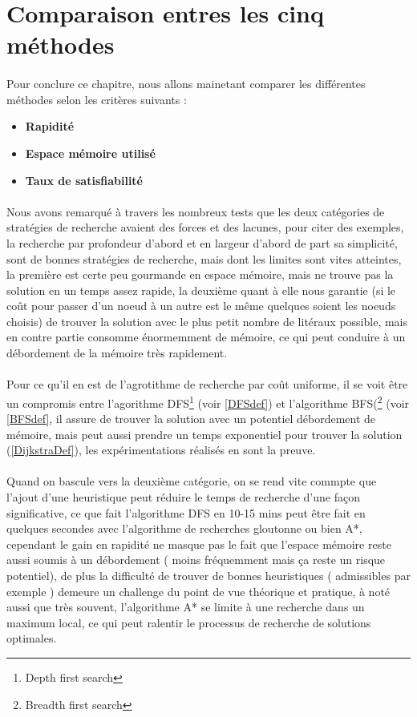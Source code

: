 \section{Comparaison entres les cinq méthodes}
\paragraph{}
Pour conclure ce chapitre, nous allons mainetant comparer 	les différentes méthodes selon les critères suivants : 
\begin{itemize}
	\item \textbf{Rapidité} 
	\item \textbf{Espace mémoire utilisé}
	\item \textbf{Taux de satisfiabilité}
\end{itemize}
\paragraph{}
Nous avons remarqué à travers les nombreux tests que les deux catégories de stratégies de recherche avaient des forces et des lacunes, pour citer des exemples, la recherche par profondeur d'abord et en largeur d'abord de part sa simplicité, sont de bonnes stratégies de recherche, mais dont les limites sont vites atteintes, la première est certe peu gourmande en espace mémoire, mais ne trouve pas la solution en un temps assez rapide, la deuxième quant à elle nous garantie (si le coût pour passer d'un noeud à un autre est le même quelques soient les noeuds choisis) de trouver la solution avec le plus petit nombre de litéraux possible, mais en contre partie consomme énormemment de mémoire, ce qui peut conduire à un débordement de la mémoire très rapidement\label{BreadthIssueCompare}.
\paragraph{}
Pour ce qu'il en est de l'agrotithme de recherche par coût uniforme, il se voit être un compromis entre l'agorithme DFS\footnote{Depth first search} (voir \ref{DFSdef}) et l'algorithme BFS(\footnote{Breadth first search} (voir \ref{BFSdef}, il assure de trouver la solution avec un potentiel débordement de mémoire, mais peut aussi prendre un temps exponentiel pour trouver la solution (\ref{DijkstraDef}), les expérimentations réalisés en sont la preuve.
\paragraph{}
Quand on bascule vers la deuxième catégorie, on se rend vite commpte que l'ajout d'une heuristique peut réduire le temps de recherche d'une façon significative, ce que fait l'algorithme DFS en 10-15 mins peut être fait en quelques secondes avec l'algorithme de recherches gloutonne ou bien A*, cependant le gain en rapidité ne masque pas le fait que l'espace mémoire reste aussi soumis à un débordement ( moins fréquemment mais ça reste un risque potentiel), de plus la difficulté de trouver de bonnes heuristiques ( admissibles par exemple ) demeure un challenge du point de vue théorique et pratique, à noté aussi que très souvent, l'algorithme A* se limite à une recherche dans un maximum local, ce qui peut ralentir le processus de recherche de solutions optimales.
